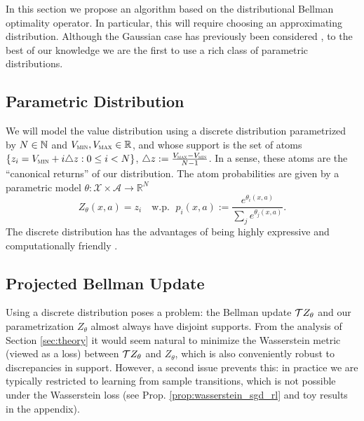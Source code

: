 \documentclass{article}
\def \Vmax {V_{\textsc{max}}}
\def \Vmin {V_{\textsc{min}}}
\begin{document}
In this section we propose an algorithm based on the distributional Bellman optimality operator. In particular, this will require choosing an approximating distribution. Although the Gaussian case has previously been considered \citep{morimura10parametric,tamar2016learning}, to the best of our knowledge we are the first to use a rich class of parametric distributions.

\subsection{Parametric Distribution}\label{sec:parametric_distribution}
We will model the value distribution using a discrete distribution parametrized by $N \in \mathbb{N}$ and $\Vmin,\Vmax \in \bR$, and whose support is the set of atoms $\{z_i = \Vmin + i \triangle z : 0 \le i < N \}$, $\triangle z := \tfrac{\Vmax - \Vmin}{N-1}$. In a sense, these atoms are the ``canonical returns'' of our distribution. The atom probabilities are given by a parametric model $\theta: \mathcal{X} \times \mathcal{A} \to \mathbb{R}^N$
\begin{equation*}
%
%
%
	Z_\theta(x, a) = z_i \quad \text{w.p. } \; p_i(x, a) := \frac{e^{\theta_i(x, a)}}{\sum\nolimits_j e^{\theta_j(x, a)}}.
%
%
\end{equation*}
The discrete distribution has the advantages of being highly expressive and computationally friendly \citep[see e.g.][]{vandenoord16pixel}.

\subsection{Projected Bellman Update}
Using a discrete distribution poses a problem: the Bellman update $\mathcal{T} Z_\theta$ and our parametrization $Z_\theta$ almost always have disjoint supports. From the analysis of Section \ref{sec:theory} it would seem natural to minimize the Wasserstein metric (viewed as a loss) between $\mathcal{T} Z_\theta$ and $Z_\theta$, which is also conveniently robust to discrepancies in support.
However, a second issue prevents this: in practice we are typically restricted to learning from sample transitions, which is not possible under the Wasserstein loss (see Prop. \ref{prop:wasserstein_sgd_rl} and toy results in the appendix).
\end{document}
